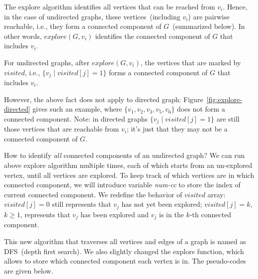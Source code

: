 The explore algorithm identifies all vertices that can be reached from $v_i$.
Hence, in the case of undirected graphs, these vertices~(including $v_i$) are pairwise reachable, 
i.e., they form a connected component of $G$~(summarized below). In other words,
$explore(G,v_i)$ identifies the connected component of $G$ that includes $v_i$.

\begin{fact}
For undirected graphs, after $explore(G, v_i)$, the vertices that are marked by $visited$, i.e.,
$\{v_j \mid visited[j] = 1\}$ forms a connected component of $G$ that includes $v_i$.
\end{fact}

However, the above fact does not apply to directed graph: Figure~\ref{fig:explore-directed} gives such an example,
where $\{v_1,v_2,v_3,v_5,v_6\}$ does not form a connected component. Note: in directed graphs
$\{v_j \mid visited[j] = 1\}$ are still those vertices that are reachable from $v_i$; it's just that
they may not be a connected component of $G$.

How to identify \emph{all} connected components of an undirected graph?
We can run above explore algorithm multiple times, each of which starts from an un-explored vertex,
until all vertices are explored. To keep track of which vertices are in which connected
component, we will introduce variable \emph{num-cc} to store the index of current connected component.
We redefine the behavior of $visited$ array: $visited[j] = 0$ still represents that $v_j$ has not yet been explored;
$visited[j] = k$, $k\ge 1$, represents that $v_j$ has been explored and $v_j$ is in the $k$-th connected component.

This new algorithm that traverses all vertices and edges of a graph is named as DFS~(depth first search).
We also slightly changed the explore function, which allows to store which connected component each vertex is in.
The pseudo-codes are given below.

\begin{minipage}{0.8\textwidth}
	\xxx
	\xxx
	\xxx
	\xxx
	\xxx
	\xxx
\end{minipage}

\begin{minipage}{0.8\textwidth}
	\xxx
	\xxx
	\xxx
	\xxx
	\xxx
	\xxx
	\xxx
	\xxx
	\xxx
	\xxx
\end{minipage}

